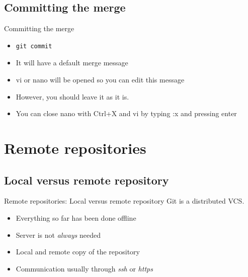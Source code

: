 \documentclass[10pt,a4paper]{beamer}
\begin{document}
\subsection{Committing the merge}
\begin{frame}[fragile]{Committing the merge}
\begin{itemize}
\item \begin{verbatim}git commit\end{verbatim}
\item It will have a default merge message
\item vi or nano will be opened so you can edit this message
\item However, you should leave it as it is.
\item You can close nano with Ctrl+X and vi by typing :x and pressing enter
\end{itemize}
\end{frame}


\section{Remote repositories}

\subsection{Local versus remote repository}
\begin{frame}{Remote repositories: Local versus remote repository}
Git is a distributed VCS.

\begin{itemize}
\item Everything so far has been done offline
\item Server is not \textit{always} needed
\item Local and remote copy of the repository
\item Communication usually through \textit{ssh} or \textit{https}
\end{itemize}
\end{frame}
\end{document}
